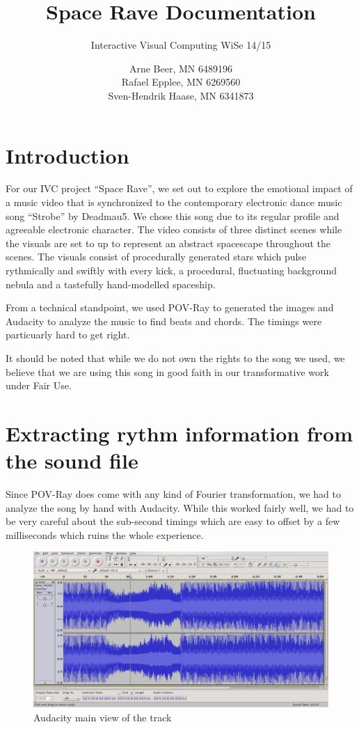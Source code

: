 \documentclass[a4paper, 12pt]{scrartcl}
\title{Space Rave Documentation}
\subtitle{Interactive Visual Computing WiSe 14/15}
\author{Arne Beer, MN 6489196\\
Rafael Epplee, MN 6269560\\
Sven-Hendrik Haase, MN 6341873}
\begin{document}
\maketitle \section{Introduction}

    For our IVC project ``Space Rave'', we set out to explore the emotional impact of a music video
    that is synchronized to the contemporary electronic dance music song ``Strobe'' by Deadmau5. We
    chose this song due to its regular profile and agreeable electronic character.  The video
    consists of three distinct scenes while the visuals are set to up to represent an abstract
    spacescape throughout the scenes. The visuals consist of procedurally generated stars which
    pulse rythmically and swiftly with every kick, a procedural, fluctuating background nebula and
    a tastefully hand-modelled spaceship.

    From a technical standpoint, we used POV-Ray to generated the images and Audacity to analyze
    the music to find beats and chords. The timings were particuarly hard to get right.

    It should be noted that while we do not own the rights to the song we used, we believe that we
    are using this song in good faith in our transformative work under Fair Use.

    \section{Extracting rythm information from the sound file}

    Since POV-Ray does come with any kind of Fourier transformation, we had to analyze the song by
    hand with Audacity. While this worked fairly well, we had to be very careful about the
    sub-second timings which are easy to offset by a few milliseconds which ruins the whole
    experience.

    \begin{figure}[H]
        \centering
        \includegraphics[scale=0.4]{audacity_main}
        \caption{Audacity main view of the track}
    \end{figure}
\end{document}
